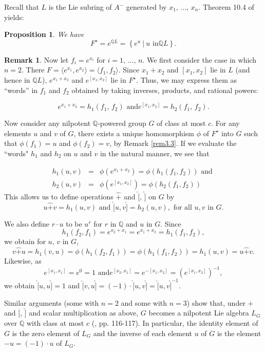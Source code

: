 \documentclass[mathscr]{amsart}
\theoremstyle{theorem}
\newtheorem{prop}[theorem]{Proposition}
\theoremstyle{definition}
\newtheorem{remark}[theorem]{Remark}
\numberwithin{equation}{section}
\def \({\left(}
\def \){\right)}
\begin{document}
Recall that $L$ is the Lie subring of $A^{-}$ generated by
$x_1,\,\dots,\,x_n$.  Theorem 10.4 of \cite{Kh} yields:

\begin{prop}\label{prop3.4}  We have
$$F^{\star}=e^{\mathbb{Q}L}=\left\{e^u\ |\ u\text{ in
}\mathbb{Q}L\right\}.$$
\end{prop}

\begin{remark}\label{rem4.5-3-28}
Now let $f_i=e^{x_i}$ for $i=1,\,\dots,\,n$.  We first consider the
case in which $n=2$.  There $F=\langle
e^{x_1},e^{x_2}\rangle=\langle f_1,f_2\rangle$.  Since $x_1+x_2$ and
$\left[x_1,x_2\right]$ lie in $L$ (and hence in $\mathbb{Q}L$),
$e^{x_1+x_2}$ and $e^{\left[x_1,x_2\right]}$ lie in $F^{\star}$.
Thus, we may express them as ``words'' in $f_1$ and $f_2$ obtained
by taking inverses, products, and rational powers:

\begin{equation}\label{eq3.4}
e^{x_1+x_2}=h_1\(f_1,\,f_2\)\text{ and
}e^{\left[x_1,x_2\right]}=h_2\(f_1,\,f_2\).
\end{equation}

Now consider any nilpotent $\mathbb{Q}$-powered group $G$ of class
at most $c$.  For any elements $u$ and $v$ of $G$, there exists a
unique homomorphism $\phi$ of $F^{\star}$ into $G$ such that
$\phi\(f_1\)=u$ and $\phi\(f_2\)=v$, by Remark \ref{rem3.3}.  If we
evaluate the ``words" $h_1$ and $h_2$ on $u$ and $v$ in the natural
manner, we see that

\begin{eqnarray}\label{eq3.5}
h_1(u,v)&=&\phi\(e^{x_1+x_2}\)=\phi\(h_1\(f_1,f_2\)\)\text{ and }\\
\nonumber
h_2(u,v)&=&\phi\(e^{\left[x_1,x_2\right]}\)=\phi\(h_2\(f_1,f_2\)\)
\end{eqnarray}
This allows us to define operations $\hat+$ and $\hat[,\,\hat]$ on
$G$ by
$$u\hat+ v=h_1(u,v)\text{ and }\hat[u,v\hat]=h_2(u,v), \text{ for
all }u,v\text{ in }G.$$

We also define $r\cdot u$ to be $u^r$ for $r$ in $\mathbb{Q}$ and
$u$ in $G$.  Since
$$h_1\(f_2,f_1\)=e^{x_2+x_1}=e^{x_1+x_2}=h_1\(f_1,f_2\),$$
we obtain for $u,\,v$ in $G$,
$$
v\hat +
u=h_1(v,u)=\phi\(h_1\(f_2,f_1\)\)=\phi\(h_1\(f_1,f_2\)\)=h_1(u,v)=u\hat
+ v.$$
Likewise, as
$$e^{\left[x_1,x_1\right]}=e^0=1\text{ and
}e^{\left[x_2,x_1\right]}=e^{-\left[x_1,x_2\right]}=\(e^{\left[x_1,x_2\right]}\)^{-1},$$
we obtain $\hat[u,u\hat]=1$ and $\hat[v,u\hat]=(-1)\cdot
\hat[u,v\hat]=\hat[u,v\hat]^{-1}.$

Similar arguments (some with $n=2$ and some with $n=3$) show that,
under $\hat+$ and $\hat[,\,\hat]$ and scalar multiplication as
above, $G$ becomes a nilpotent Lie algebra $L_G$ over $\mathbb{Q}$
with class at most $c$ (\cite{Kh}, pp. 116-117).  In particular, the
identity element of $G$ is the zero element of $L_G$ and the inverse
of each element $u$ of $G$ is the element $-u=(-1)\cdot u$ of $L_G$.
\end{remark}
\end{document}
